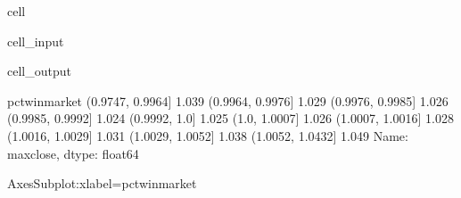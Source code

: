 \documentclass[letterpaper,10pt,english]{jupyterBook}
\begin{document}
\begin{sphinxuseclass}{cell}\begin{sphinxVerbatimInput}

\begin{sphinxuseclass}{cell_input}
\begin{sphinxVerbatim}[commandchars=\\\{\}]
  \PYG{p}{[}\PYG{p}{]} 
\PYG{p}{[}\PYG{p}{]}
\PYG{p}{[}\PYG{p}{]}
\end{sphinxVerbatim}

\end{sphinxuseclass}\end{sphinxVerbatimInput}
\begin{sphinxVerbatimOutput}

\begin{sphinxuseclass}{cell_output}
\begin{sphinxVerbatim}[commandchars=\\\{\}]
pct\PYGZus{}win\PYGZus{}market
(0.9747, 0.9964]   1.039
(0.9964, 0.9976]   1.029
(0.9976, 0.9985]   1.026
(0.9985, 0.9992]   1.024
(0.9992, 1.0]      1.025
(1.0, 1.0007]      1.026
(1.0007, 1.0016]   1.028
(1.0016, 1.0029]   1.031
(1.0029, 1.0052]   1.038
(1.0052, 1.0432]   1.049
Name: max\PYGZus{}close, dtype: float64
\end{sphinxVerbatim}

\begin{sphinxVerbatim}[commandchars=\\\{\}]
\PYGZlt{}AxesSubplot:xlabel=\PYGZsq{}pct\PYGZus{}win\PYGZus{}market\PYGZsq{}\PYGZgt{}
\end{sphinxVerbatim}

\noindent{}

\end{sphinxuseclass}\end{sphinxVerbatimOutput}

\end{sphinxuseclass}
\end{document}
